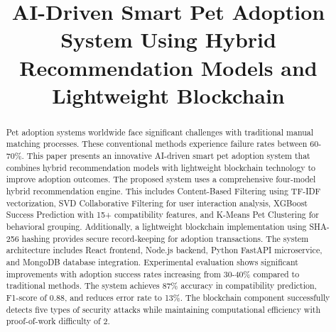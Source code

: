 \documentclass[conference]{IEEEtran}
\begin{document}
\title{AI-Driven Smart Pet Adoption System Using Hybrid Recommendation Models and Lightweight Blockchain}

\author{
\and
{}
}

\maketitle

\begin{abstract}
Pet adoption systems worldwide face significant challenges with traditional manual matching processes. These conventional methods experience failure rates between 60-70\%. This paper presents an innovative AI-driven smart pet adoption system that combines hybrid recommendation models with lightweight blockchain technology to improve adoption outcomes. The proposed system uses a comprehensive four-model hybrid recommendation engine. This includes Content-Based Filtering using TF-IDF vectorization, SVD Collaborative Filtering for user interaction analysis, XGBoost Success Prediction with 15+ compatibility features, and K-Means Pet Clustering for behavioral grouping. Additionally, a lightweight blockchain implementation using SHA-256 hashing provides secure record-keeping for adoption transactions. The system architecture includes React frontend, Node.js backend, Python FastAPI microservice, and MongoDB database integration. Experimental evaluation shows significant improvements with adoption success rates increasing from 30-40\% compared to traditional methods. The system achieves 87\% accuracy in compatibility prediction, F1-score of 0.88, and reduces error rate to 13\%. The blockchain component successfully detects five types of security attacks while maintaining computational efficiency with proof-of-work difficulty of 2.
\end{abstract}
\end{document}
